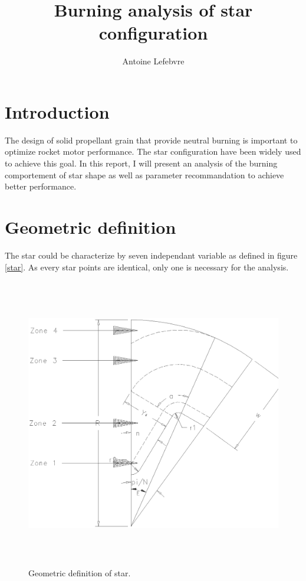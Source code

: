 \documentclass[11pt, titlepage]{article}
\begin{document}
\author{Antoine Lefebvre}
\title{Burning analysis of star configuration}
\maketitle

\tableofcontents 

\newpage

\section{Introduction}

The design of solid propellant grain that provide neutral burning
is important to optimize rocket motor performance. The star
configuration have been widely used to achieve this goal. In this
report, I will present an analysis of the burning comportement of star
shape as well as parameter recommandation to achieve better
performance.

\section{Geometric definition}

The star could be characterize by seven independant variable as
defined in figure \ref{star}. As every star points are identical,
only one is necessary for the analysis. 

\begin{figure}
 \begin{center}
 \includegraphics[height=5in]{img/variable.ps}
      \caption{Geometric definition of star.}\label{variable}
 \end{center}
\end{figure}
\end{document}
